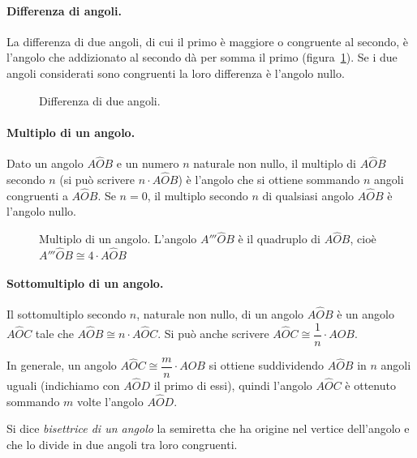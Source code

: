 \paragraph{Differenza di angoli.} La differenza di due angoli, di cui il primo è maggiore o congruente al secondo, è l'angolo che addizionato al secondo dà per somma il primo (figura~\ref{fig:1.33}). Se i due angoli considerati sono congruenti la loro differenza è l'angolo nullo.

\begin{figure}[htb]
\centering
\caption{Differenza di due angoli.}\label{fig:1.33}
\end{figure}

\paragraph{Multiplo di un angolo.} Dato un angolo $A\widehat{O}B$ e un numero $n$ naturale non nullo, il multiplo di $A\widehat{O}B$ secondo $n$ (si può scrivere $n\cdot A\widehat{O}B$) è l'angolo che si ottiene sommando $n$ angoli congruenti a $A\widehat{O}B$. Se $n=0$, il multiplo secondo $n$ di qualsiasi angolo $A\widehat{O}B$ è l'angolo nullo.

\begin{figure}[htb]
\centering
\caption{Multiplo di un angolo. L'angolo $A'''\widehat{O}B$ è il quadruplo di $A\widehat{O}B$, cioè $A'''\widehat{O}B \cong 4\cdot A\widehat{O}B$}
\end{figure}

\paragraph{Sottomultiplo di un angolo.} Il sottomultiplo secondo $n$, naturale non nullo, di un angolo $A\widehat{O}B$ è un angolo $A\widehat{O}C$ tale che $A\widehat{O}B \cong n\cdot A\widehat{O}C$. Si può anche scrivere $A\widehat{O}C\cong \dfrac{1}{n}\cdot A\widehat{O}B$.

In generale, un angolo $A\widehat{O}C\cong\dfrac{m}{n}\cdot A\widehat{O}B$ si ottiene suddividendo $A\widehat{O}B$ in $n$ angoli uguali (indichiamo con $A\widehat{O}D$ il primo di essi), quindi l'angolo $A\widehat{O}C$ è ottenuto sommando $m$ volte l'angolo $A\widehat{O}D$.

\begin{definizione}
Si dice \emph{bisettrice di un angolo} la semiretta che ha origine nel vertice dell'angolo e che lo divide in due angoli tra loro congruenti.
\end{definizione}

